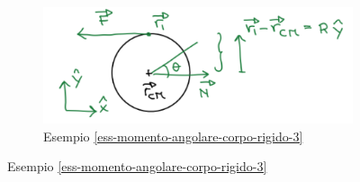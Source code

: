 \begin{figure}[h!]
\begin{subfigure}{0.2\textwidth}
    \end{subfigure}
    \begin{subfigure}{0.39\textwidth}
        \centering
        \includegraphics[width=\textwidth]{images/ess-momento-angolare-corpo-rigido-3.png}
        \caption*{Esempio \ref{ess-momento-angolare-corpo-rigido-3}}
    \end{subfigure}
\end{figure}

